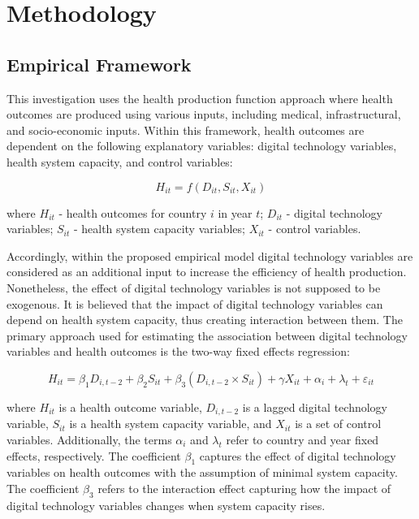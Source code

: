 \documentclass[12pt]{article}
\begin{document}
\section{Methodology}

\subsection{Empirical Framework}

This investigation uses the health production function approach where health outcomes are produced using various inputs, including medical, infrastructural, and socio-economic inputs. Within this framework, health outcomes are dependent on the following explanatory variables: digital technology variables, health system capacity, and control variables:

\begin{equation}
H_{it} = f(D_{it}, S_{it}, X_{it})
\end{equation}

where $H_{it}$ - health outcomes for country $i$ in year $t$; $D_{it}$ - digital technology variables; $S_{it}$ - health system capacity variables; $X_{it}$ - control variables.

Accordingly, within the proposed empirical model digital technology variables are considered as an additional input to increase the efficiency of health production. Nonetheless, the effect of digital technology variables is not supposed to be exogenous. It is believed that the impact of digital technology variables can depend on health system capacity, thus creating interaction between them.
The primary approach used for estimating the association between digital technology variables and health outcomes is the two-way fixed effects regression:

\begin{equation}
H_{it} = \beta_1 D_{i,t-2} + \beta_2 S_{it} + \beta_3 (D_{i,t-2} \times S_{it}) + \gamma X_{it} + \alpha_i + \lambda_t + \varepsilon_{it}
\end{equation}

where $H_{it}$ is a health outcome variable, $D_{i,t-2}$ is a lagged digital technology variable, $S_{it}$ is a health system capacity variable, and $X_{it}$ is a set of control variables. Additionally, the terms $\alpha_i$ and $\lambda_t$ refer to country and year fixed effects, respectively. The coefficient $\beta_1$ captures the effect of digital technology variables on health outcomes with the assumption of minimal system capacity. The coefficient $\beta_3$ refers to the interaction effect capturing how the impact of digital technology variables changes when system capacity rises.
\end{document}
